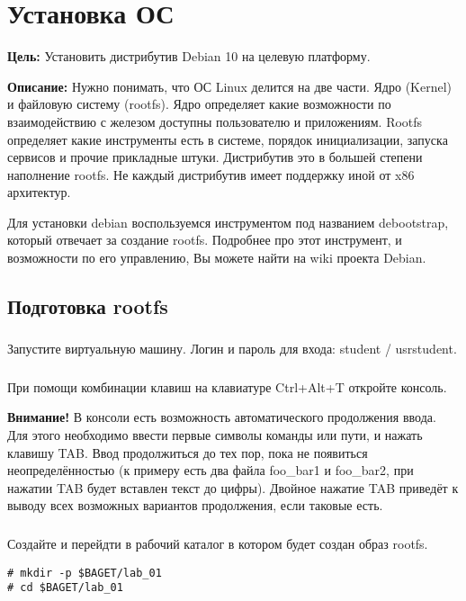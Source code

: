 \chapter{Установка ОС}
\textbf{Цель:} Установить дистрибутив Debian 10 на целевую платформу.

\vspace{5mm}
\textbf{Описание:} Нужно понимать, что ОС Linux делится на две части. Ядро (Kernel) и файловую систему (rootfs). Ядро определяет какие возможности по взаимодействию с железом доступны пользователю и приложениям. Rootfs определяет какие инструменты есть в системе, порядок инициализации, запуска сервисов и прочие прикладные штуки. Дистрибутив это в большей степени наполнение rootfs. Не каждый дистрибутив имеет поддержку иной от x86 архитектур.

Для установки debian воспользуемся инструментом под названием debootstrap, который отвечает за создание rootfs. Подробнее про этот инструмент, и возможности по его управлению, Вы можете найти на wiki проекта Debian.


\section{Подготовка rootfs}

\subsection{}Запустите виртуальную машину. Логин и пароль для входа: student / usrstudent.

\subsection{} При помощи комбинации клавиш на клавиатуре Ctrl+Alt+T откройте консоль.

\vspace{5mm}
\textbf{Внимание!} В консоли есть возможность автоматического продолжения ввода. Для этого необходимо ввести первые символы команды или пути, и нажать клавишу TAB. Ввод продолжиться до тех пор, пока не появиться неопределённостью (к примеру есть два файла foo\_bar1 и foo\_bar2, при нажатии TAB будет вставлен текст до цифры). Двойное нажатие TAB приведёт к выводу всех возможных вариантов продолжения, если таковые есть.

\subsection{}Создайте и перейдти в рабочий каталог в котором будет создан образ rootfs.
\begin{lstlisting}[style=bash]
# mkdir -p $BAGET/lab_01
# cd $BAGET/lab_01 
\end{lstlisting}


